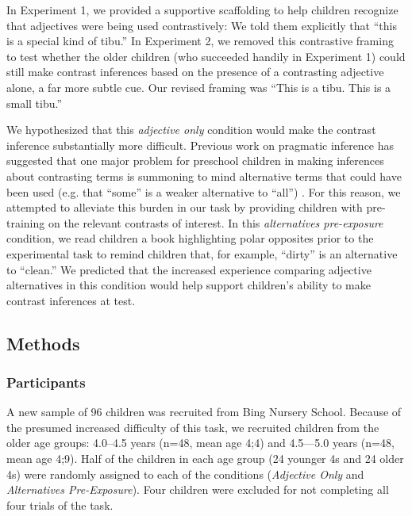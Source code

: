 \documentclass[man]{apa2}
\begin{document}

In Experiment 1, we provided a supportive scaffolding to help children recognize that adjectives were being used contrastively: We told them explicitly that ``this is a special kind of tibu.''  In Experiment 2, we removed this contrastive framing to test whether the older children (who succeeded handily in Experiment 1) could still make contrast inferences based on the presence of a contrasting adjective alone, a far more subtle cue. Our revised framing was ``This is a tibu. This is a small tibu.'' 

We hypothesized that this \emph{adjective only} condition would make the contrast inference substantially more difficult. Previous work on pragmatic inference has suggested that one major problem for preschool children in making inferences about contrasting terms is summoning to mind alternative terms that could have been used (e.g. that ``some'' is a weaker alternative to ``all'') \cite{barner2011}. For this reason, we attempted to alleviate this burden in our task by providing children with pre-training on the relevant contrasts of interest. In this \emph{alternatives pre-exposure} condition, we read children a book highlighting polar opposites prior to the experimental task to remind children that, for example, ``dirty'' is an alternative to ``clean.'' We predicted that the increased experience comparing adjective alternatives in this condition would help support children's ability to make contrast inferences at test.


\subsection{Methods}

\subsubsection{Participants}

A new sample of 96 children was recruited from Bing Nursery School.  Because of the presumed increased difficulty of this task, we recruited children from the older age groups: 4.0--4.5 years (n=48, mean age 4;4) and 4.5---5.0 years (n=48, mean age 4;9).  Half of the children in each age group (24 younger 4s and 24 older 4s) were randomly assigned to each of the conditions (\emph{Adjective Only} and \emph{Alternatives Pre-Exposure}). Four children were excluded for not completing all four trials of the task. 
\end{document}
